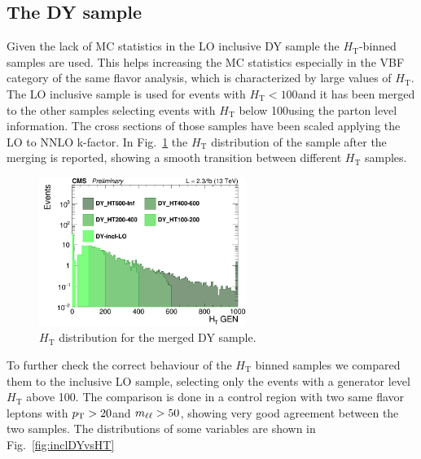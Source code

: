 \subsection{The DY sample}\label{sec:DY}

Given the lack of MC statistics in the LO inclusive DY sample the
$H_\mathrm{T}$-binned samples are used. This helps increasing the MC
statistics especially in the VBF category of the same flavor analysis, which is characterized by large values of $H_\mathrm{T}$.
The LO inclusive sample is used for events with $H_\mathrm{T} < 100$\GeV and it has been merged to the other samples selecting events with $H_\mathrm{T}$ below 100\GeV using the parton level information. The cross sections of those samples have been scaled applying the LO to NNLO k-factor. In Fig.~\ref{fig:DY_HT} the $H_\mathrm{T}$ distribution of the sample after the merging is reported, showing a smooth transition between different $H_\mathrm{T}$ samples.

\begin{figure}[htbp]
\centering
\includegraphics[width=0.6\textwidth]{../AN/Figs/log_c_incl_HTGen.png}
\caption{
    $H_\mathrm{T}$ distribution for the merged DY sample.}
    \label{fig:DY_HT}
\end{figure}


To further check the correct behaviour of the $H_\mathrm{T}$ binned samples we compared them to the inclusive LO sample, selecting only the events with a generator level $H_\mathrm{T}$ above 100\GeV. The comparison is done in a control region with two same flavor leptons with $p_{\mathrm{T}} > 20$\GeV and $m_{\ell\ell} > 50$\GeV, showing very good agreement between the two samples. The distributions of some variables are shown in Fig.~\ref{fig:inclDYvsHT}

